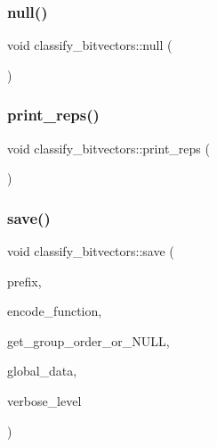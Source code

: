 \mbox{\label{classclassify__bitvectors_a2f5464d3b9c38e8980f1bccb6fd90324}} 
\subsubsection{\texorpdfstring{null()}{null()}}
{\footnotesize\ttfamily void classify\+\_\+bitvectors\+::null (\begin{DoxyParamCaption}{ }\end{DoxyParamCaption})}

\mbox{\label{classclassify__bitvectors_ab67b507ccf01ebf9e9a559c0cadc1691}} 
\subsubsection{\texorpdfstring{print\+\_\+reps()}{print\_reps()}}
{\footnotesize\ttfamily void classify\+\_\+bitvectors\+::print\+\_\+reps (\begin{DoxyParamCaption}{ }\end{DoxyParamCaption})}

\mbox{\label{classclassify__bitvectors_a88b83bfd067704c5213d63797a836c5b}} 
\subsubsection{\texorpdfstring{save()}{save()}}
{\footnotesize\ttfamily void classify\+\_\+bitvectors\+::save (\begin{DoxyParamCaption}\item[{const \mbox{\hyperlink{galois_8h_ab6cc7b4aeb6ea31aba2b3fbfc83ff5e6}{B\+Y\+TE}} $\ast$}]{prefix,  }\item[{void($\ast$)(void $\ast$extra\+\_\+data, \mbox{\hyperlink{galois_8h_a09fddde158a3a20bd2dcadb609de11dc}{I\+NT}} $\ast$\&encoding, \mbox{\hyperlink{galois_8h_a09fddde158a3a20bd2dcadb609de11dc}{I\+NT}} \&encoding\+\_\+sz, void $\ast$\mbox{\hyperlink{classglobal__data}{global\+\_\+data}})}]{encode\+\_\+function,  }\item[{void($\ast$)(void $\ast$extra\+\_\+data, \mbox{\hyperlink{classlonginteger__object}{longinteger\+\_\+object}} \&\mbox{\hyperlink{simeon_8_c_a1516b736c8ebbfb03a9dd7d8826cd9a6}{go}}, void $\ast$\mbox{\hyperlink{classglobal__data}{global\+\_\+data}})}]{get\+\_\+group\+\_\+order\+\_\+or\+\_\+\+N\+U\+LL,  }\item[{void $\ast$}]{global\+\_\+data,  }\item[{\mbox{\hyperlink{galois_8h_a09fddde158a3a20bd2dcadb609de11dc}{I\+NT}}}]{verbose\+\_\+level }\end{DoxyParamCaption})}



